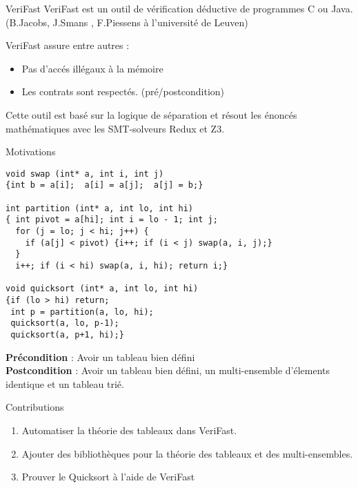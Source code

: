 \documentclass[]{beamer}
\newcommand{\verifast}{VeriFast}
\begin{document}
\begin{frame}{\verifast}
	\verifast{} est un outil de v\'erification d\'eductive de programmes C ou Java. (B.Jacobs, J.Smans , F.Piessens \`a l'universit\'e de Leuven) 
	
	\verifast{} assure entre autres :
	\begin{itemize}
	\item Pas d'acc\'es ill\'egaux \`a la m\'emoire
	\item Les contrats sont respect\'es. (pr\'e/postcondition) 
\end{itemize}	
Cette outil est bas\'e sur la logique de s\'eparation et r\'esout les \'enonc\'es math\'ematiques avec les SMT-solveurs Redux et Z3.
\end{frame}






\begin{frame}[fragile]{Motivations}

\begin{lstlisting}[basicstyle=\footnotesize]
void swap (int* a, int i, int j)
{int b = a[i];  a[i] = a[j];  a[j] = b;}

int partition (int* a, int lo, int hi)
{ int pivot = a[hi]; int i = lo - 1; int j;
  for (j = lo; j < hi; j++) {
    if (a[j] < pivot) {i++; if (i < j) swap(a, i, j);}
  }
  i++; if (i < hi) swap(a, i, hi); return i;}
  
void quicksort (int* a, int lo, int hi)
{if (lo > hi) return;
 int p = partition(a, lo, hi);
 quicksort(a, lo, p-1);
 quicksort(a, p+1, hi);}

		\end{lstlisting}
\textbf{Pr\'econdition} : Avoir un tableau bien d\'efini\\
\textbf{Postcondition} : Avoir un tableau bien d\'efini, un multi-ensemble d'\'elements identique et un tableau tri\'e.
\end{frame}








\begin{frame}{Contributions}
	\begin{enumerate}
		\item Automatiser la th\'eorie des tableaux dans \verifast.
		\item Ajouter des biblioth\`eques pour la th\'eorie des tableaux et des multi-ensembles.
		\item Prouver le Quicksort \`a l'aide de \verifast
	\end{enumerate}
\end{frame}
\end{document}
